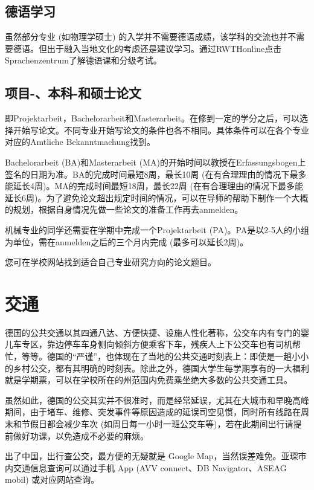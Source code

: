   \subsection{德语学习}\label{subsec:德语学习}

    虽然部分专业 (如物理学硕士) 的入学并不需要德语成绩，该学科的交流也并不需要德语。但出于融入当地文化的考虑还是建议学习。通过RWTHonline点击Sprachenzentrum了解德语课和分级考试。

  \subsection{项目-、本科-和硕士论文}\label{subsec:项目-、本科-和硕士论文}

    即Projektarbeit，Bachelorarbeit和Masterarbeit。在修到一定的学分之后，可以选择开始写论文。不同专业开始写论文的条件也各不相同。具体条件可以在各个专业对应的Amtliche Bekanntmachung找到。

    Bachelorarbeit (BA)和Masterarbeit (MA)的开始时间以教授在Erfassungsbogen上签名的日期为准。BA的完成时间最短8周，最长10周 (在有合理理由的情况下最多能延长4周)。MA的完成时间最短18周，最长22周 (在有合理理由的情况下最多能延长6周)。为了避免论文超出规定时间的情况，可以在导师的帮助下制作一个大概的规划，根据自身情况先做一些论文的准备工作再去anmelden。

    机械专业的同学还需要在学期中完成一个Projektarbeit (PA)。PA是以2-5人的小组为单位，需在anmelden之后的三个月内完成 (最多可以延长2周)。

    您可在学校网站找到适合自己专业研究方向的论文题目。

\section{交通}\label{sec:交通}

  德国的公共交通以其四通八达、方便快捷、设施人性化著称，公交车内有专门的婴儿车专区，靠边停车车身侧向倾斜方便乘客下车，残疾人上下公交车也有司机帮忙，等等。德国的``严谨''，也体现在了当地的公共交通时刻表上：即使是一趟小小的乡村公交，都有其明确的时刻表。除此之外，德国大学生每学期享有的一大福利就是学期票，可以在学校所在的州范围内免费乘坐绝大多数的公共交通工具。

  虽然如此，德国的公交其实并不很准时，而是经常延误，尤其在大城市和早晚高峰期间，由于堵车、维修、突发事件等原因造成的延误司空见惯，同时所有线路在周末和节假日都会减少车次 (如周日每一小时一班公交车等)，若在此期间出行请提前做好功课，以免造成不必要的麻烦。 

  出了中国，出行查公交，最方便的无疑就是 Google Map，当然误差难免。亚琛市内交通信息查询可以通过手机 App (AVV connect、DB Navigator、ASEAG mobil) 或对应网站查询。

